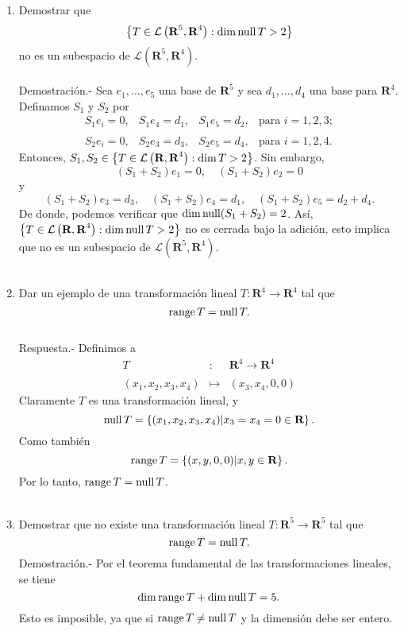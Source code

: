 \begin{enumerate}[\bfseries 1.]
    \item Demostrar que
    $$\left\{ T\in \mathcal{L}\left(\textbf{R}^5,\textbf{R}^4\right):\dim \operatorname{null} T>2 \right\}$$
    no es un subespacio de $\mathcal{L}\left(\textbf{R}^5,\textbf{R}^4\right)$.\\\\
	Demostración.-\; Sea $e_1,\ldots,e_5$ una base de $\textbf{R}^5$ y sea $d_1,\ldots,d_4$ una base para $\textbf{R}^4$. Definamos $S_1$ y $S_2$ por
	$$
	\begin{array}{cccc}
	    S_1e_i=0,&S_1e_4=d_1,&S_1e_5=d_2,&\mbox{para } i=1,2,3;\\\\
	    S_2e_i=0,&S_2e_3=d_3,&S_2e_5=d_4,&\mbox{para } i=1,2,4.
	\end{array}
	$$
	Entonces, $S_1,S_2\in \left\{T\in \mathcal{L}\left(\textbf{R},\textbf{R}^4\right):\dim \null T > 2\right\}$. Sin embargo,
	$$(S_1+S_2)e_1=0,\quad (S_1+S_2)e_2=0$$
	y
	$$(S_1+S_2)e_3=d_3, \quad (S_1+S_2)e_4=d_1, \quad (S_1+S_2)e_5=d_2+d_4.$$
	De donde, podemos verificar que $\dim \operatorname{null}(S_1+S_2)=2$. Así, $\left\{T\in \mathcal{L}\left(\textbf{R},\textbf{R}^4\right):\dim \operatorname{null} T > 2\right\}$ no es cerrada bajo la adición, esto implica que no es un subespacio de $\mathcal{L}\left(\textbf{R}^5,\textbf{R}^4\right)$.\\\\

    \item Dar un ejemplo de una transformación lineal $T:\textbf{R}^4\to \textbf{R}^4$ tal que
    $$\operatorname{range} T=\operatorname{null} T.$$\\
	Respuesta.-\; Definimos a
	$$
	\begin{array}{rcl}
	    T &:& \textbf{R}^4\to \textbf{R}^4\\\\
	    (x_1,x_2,x_3,x_4) &\mapsto & (x_3,x_4,0,0)
	\end{array}
	$$
	Claramente $T$ es una transformación lineal, y 
	$$\operatorname{null} T = \left\{(x_1,x_2,x_3,x_4) | x_3=x_4=0 \in \textbf{R}\right\}.$$
	Como también 
	$$\operatorname{range} T = \left\{(x,y,0,0) | x,y \in \textbf{R}\right\}.$$
	Por lo tanto, $\operatorname{range} T = \operatorname{null} T$.\\\\

    \item Demostrar que no existe una transformación lineal $T:\textbf{R}^5\to \textbf{R}^5$ tal que
    $$\operatorname{range} T = \operatorname{null} T.$$
	Demostración.-\; Por el teorema fundamental de las transformaciones lineales, se tiene
	$$\dim \operatorname{range} T + \dim \operatorname{null} T = 5.$$
	Esto es imposible, ya que si $\operatorname{range} T \neq \operatorname{null} T$  y la dimensión debe ser entero.\\\\


\end{enumerate}
